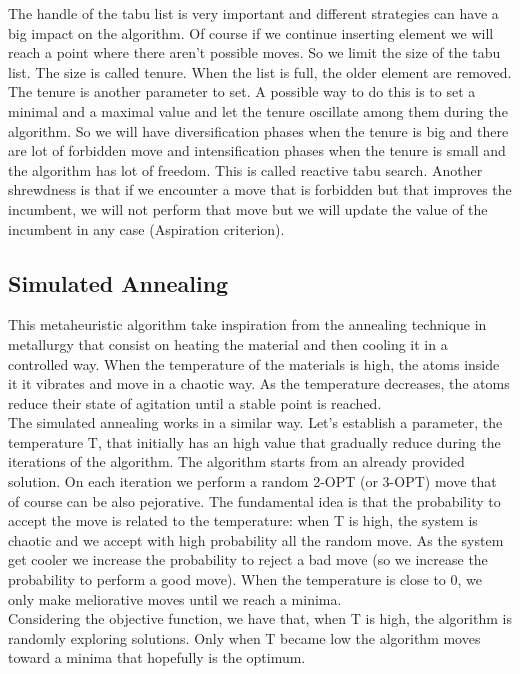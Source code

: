 \noindent The handle of the tabu list is very important and different strategies can have a big impact on the algorithm. Of course if we continue inserting element we will reach a point where there aren't possible moves. So we limit the size of the tabu list. The size is called tenure. When the list is full, the older element are removed.
The tenure is another parameter to set. A possible way to do this is to set a minimal and a maximal value and let the tenure oscillate among them during the algorithm. So we will have diversification phases when the tenure is big and there are lot of forbidden move and intensification phases when the tenure is small and the algorithm has lot of freedom. This is called reactive tabu search.
Another shrewdness is that if we encounter a move that is forbidden but that improves the incumbent, we will not perform that move but we will update the value of the incumbent in any case (Aspiration criterion).


\subsection{Simulated Annealing}
This metaheuristic algorithm take inspiration from the annealing technique in metallurgy that consist on heating the material and then cooling it in a controlled way. When the temperature of the materials is high, the atoms inside it it vibrates and move in a chaotic way. As the temperature decreases, the atoms reduce their state of agitation until a stable point is reached. \\
The simulated annealing works in a similar way. Let's establish a parameter, the temperature T, that initially has an high value that gradually reduce during the iterations of the algorithm. The algorithm starts from an already provided solution. On each iteration we perform a random 2-OPT (or 3-OPT) move that of course can be also pejorative. The fundamental idea is that the probability to accept the move is related to the temperature: when T is high, the system is chaotic and we accept with high probability all the random move. As the system get cooler we increase the probability to reject a bad move (so we increase the probability to perform a good move). When the temperature is close to 0, we only make meliorative moves until we reach a minima.\\
Considering the objective function, we have that, when T is high, the algorithm is randomly exploring solutions. Only when T became low the algorithm moves toward a minima that hopefully is the optimum.

